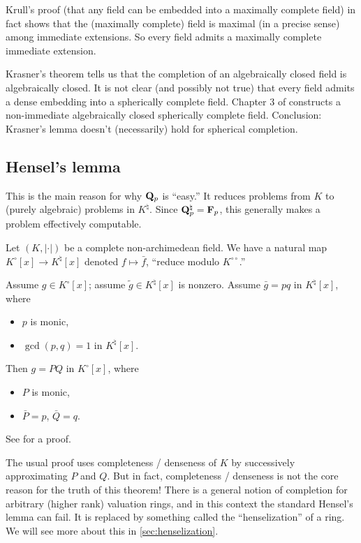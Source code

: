 Krull's proof (that any field can be embedded into a maximally complete 
field) in fact shows that the (maximally complete) field is maximal (in a 
precise sense) among immediate extensions. So every field admits a maximally 
complete immediate extension. 

Krasner's theorem tells us that the completion of an algebraically closed 
field is algebraically closed. It is not clear (and possibly not true) that 
every field admits a dense embedding into a spherically complete field. Chapter 
3 of \cite{robert-2000} constructs a non-immediate algebraically closed 
spherically complete field. Conclusion: Krasner's lemma doesn't (necessarily) 
hold for spherical completion. 





\subsection{Hensel's lemma}

This is the main reason for why $\mathbf{Q}_p$ is ``easy.'' It reduces problems from 
$K$ to (purely algebraic) problems in $K^\natural$. Since 
$\mathbf{Q}_p^\natural=\mathbf{F}_p$, this generally makes a problem effectively computable. 

Let $(K,|\cdot|)$ be a complete non-archimedean field. We have a natural map 
$K^\circ[x]\to K^\natural[x]$ denoted $f\mapsto \bar f$, ``reduce modulo 
$K^{\circ\circ}$.''

\begin{theorem}[Hensel]\label{thm:Hensel}
Assume $g\in K^\circ[x]$; assume $\tilde g\in K^\natural[x]$ is nonzero. 
Assume $\bar g=p q$ in $K^\natural[x]$, where 
\begin{itemize}
\item
$p$ is monic, 

\item
$\gcd(p,q)=1$ in $K^\natural[x]$.
\end{itemize}
Then $g=P Q$ in $K^\circ[x]$, where 
\begin{itemize}
\item $P$ is monic, 
\item $\bar P=p$, $\bar Q=q$. 
\end{itemize}
\end{theorem}

See \cite{bosch-2014} for a proof. 

The usual proof uses completeness / denseness of $K$ by successively 
approximating $P$ and $Q$. But in fact, completeness / denseness is not the 
core reason for the truth of this theorem! There is a general notion of 
completion for arbitrary (higher rank) valuation rings, and in this context the 
standard Hensel's lemma can fail. It is replaced by something called the 
``henselization'' of a ring. We will see more about this in 
\autoref{sec:henselization}. 

